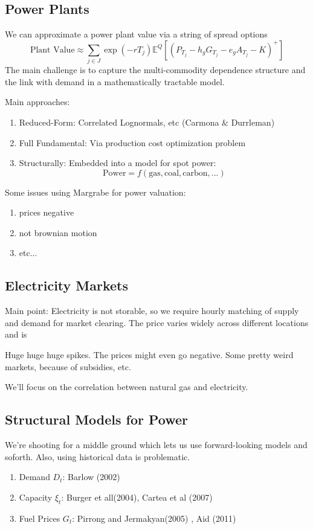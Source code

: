 \subsection{Power Plants}
We can approximate a power plant value via a string of spread options
\begin{equation}
	\text{Plant Value} \approx \sum_{j\in J} \exp(-rT_j) \mathbb{E}^Q \left[ (P_{T_j}- h_gG_{T_j} - e_g A_{T_j} - K)^+ \right]
\end{equation}
The main challenge is to capture the multi-commodity dependence structure and the link with demand in a mathematically tractable model.

Main approaches:
\begin{enumerate}
	\item Reduced-Form: Correlated Lognormals, etc (Carmona \& Durrleman)
	\item Full Fundamental: Via production cost optimization problem
	\item Structurally: Embedded into a model for spot power:
	\begin{equation}
		\text{Power} = f(\text{gas}, \text{coal}, \text{carbon}, ...)
	\end{equation}
\end{enumerate}

Some issues using Margrabe for power valuation:
\begin{enumerate}
	\item prices negative
	\item not brownian motion
	\item etc...
\end{enumerate}

\subsection{Electricity Markets}
Main point: Electricity is not storable, so we require hourly matching of supply and demand for market clearing. The price varies widely across different locations and is 

Huge huge huge spikes. The prices might even go negative. Some pretty weird markets, because of subsidies, etc.

We'll focus on the correlation between natural gas and electricity.

\subsection{Structural Models for Power}
We're shooting for a middle ground which lets us use forward-looking models and soforth. Also, using historical data is problematic.
\begin{enumerate}
	\item Demand $D_t$: Barlow (2002)
	\item Capacity $\xi_t$: Burger et all(2004), Cartea et al (2007)
	\item Fuel Prices $G_t$: Pirrong and Jermakyan(2005) , Aid (2011)
\end{enumerate}

